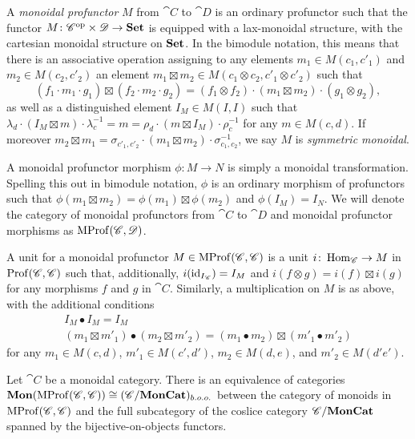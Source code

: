 \documentclass[12pt,oneside,article,draft]{memoir}
\begin{document}
A \emph{monoidal profunctor} $M$ from $\cat{C}$ to $\cat{D}$ is an ordinary profunctor such that the functor $M\colon {\mathscr{C}}^{\text{op}}\times\mathscr{D}\to\mathbf{Set}$ is equipped with a lax-monoidal structure, with the cartesian monoidal structure on $\mathbf{Set}$. In the bimodule notation, this means that there is an associative operation assigning to any elements $m_1\in M(c_1,c'_1)$ and $m_2\in M(c_2,c'_2)$ an element $m_1\boxtimes m_2\in M(c_1\otimes c_2,c'_1\otimes c'_2)$ such that
\[
	(f_1\cdot m_1\cdot g_1)\boxtimes(f_2\cdot m_2\cdot g_2) = (f_1\otimes f_2)\cdot(m_1\boxtimes m_2)\cdot(g_1\otimes g_2),
\]
as well as a distinguished element $I_M\in M(I,I)$ such that $\lambda_d\cdot(I_M\boxtimes m)\cdot\lambda^{-1}_c = m = \rho_d\cdot(m\boxtimes I_M)\cdot\rho^{-1}_c$ for any $m\in M(c,d)$. If moreover $m_2\boxtimes m_1 = \sigma_{c'_1,c'_2}\cdot(m_1\boxtimes m_2)\cdot\sigma_{c_1,c_2}^{-1}$, we say $M$ is \emph{symmetric monoidal}.

A monoidal profunctor morphism $\phi\colon M\to N$ is simply a monoidal transformation. Spelling this out in bimodule notation, $\phi$ is an ordinary morphism of profunctors such that $\phi(m_1\boxtimes m_2)=\phi(m_1)\boxtimes\phi(m_2)$ and $\phi(I_M)=I_N$. We will denote the category of monoidal profunctors from $\cat{C}$ to $\cat{D}$ and monoidal profunctor morphisms as $\operatorname{MProf}(\mathscr{C},\mathscr{D})$.

A unit for a monoidal profunctor $M\in\operatorname{MProf}(\mathscr{C},\mathscr{C})$ is a unit $i\colon\operatorname{Hom}_{\mathscr{C}}\to M$ in $\operatorname{Prof}(\mathscr{C},\mathscr{C})$ such that, additionally, $i(\operatorname{id}_{I_{\mathscr{C}}})=I_M$ and $i(f\otimes g)=i(f)\boxtimes i(g)$ for any morphisms $f$ and $g$ in $\cat{C}$. Similarly, a multiplication on $M$ is as above, with the additional conditions
\begin{gather*}
	I_M\bullet I_M=I_M \\
	(m_1\boxtimes m'_1)\bullet(m_2\boxtimes m'_2) = (m_1\bullet m_2)\boxtimes(m'_1\bullet m'_2)
\end{gather*}
for any $m_1\in M(c,d)$, $m'_1\in M(c',d')$, $m_2\in M(d,e)$, and $m'_2\in M(d'e')$.

\begin{lemma}
	Let $\cat{C}$ be a monoidal category. There is an equivalence of categories $\mathbf{Mon}(\operatorname{MProf}(\mathscr{C},\mathscr{C}))\cong (\mathscr{C}/\mathbf{MonCat})_{b.o.o.}$ between the category of monoids in $\operatorname{MProf}(\mathscr{C},\mathscr{C})$ and the full subcategory of the coslice category $\mathscr{C}/\mathbf{MonCat}$ spanned by the bijective-on-objects functors.
\end{lemma}
\end{document}
